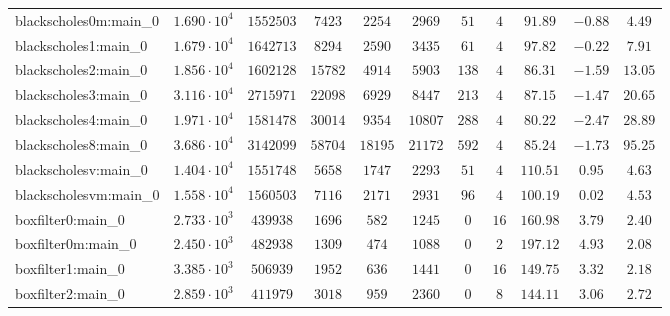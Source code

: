 \begin{tabular}{|l|c|c|c|c|c|c|c|c|c|c|}
blackscholes0m:main\_0         & $ 1.690 \cdot 10^{4} $ & $ 1552503  $ & $ 7423   $ & $ 2254   $ & $ 2969   $ & $ 51   $ & $ 4    $ & $ 91.89       $ & $ -0.88   $ & $ 4.49    $ \\
blackscholes1:main\_0          & $ 1.679 \cdot 10^{4} $ & $ 1642713  $ & $ 8294   $ & $ 2590   $ & $ 3435   $ & $ 61   $ & $ 4    $ & $ 97.82       $ & $ -0.22   $ & $ 7.91    $ \\
blackscholes2:main\_0          & $ 1.856 \cdot 10^{4} $ & $ 1602128  $ & $ 15782  $ & $ 4914   $ & $ 5903   $ & $ 138  $ & $ 4    $ & $ 86.31       $ & $ -1.59   $ & $ 13.05   $ \\
blackscholes3:main\_0          & $ 3.116 \cdot 10^{4} $ & $ 2715971  $ & $ 22098  $ & $ 6929   $ & $ 8447   $ & $ 213  $ & $ 4    $ & $ 87.15       $ & $ -1.47   $ & $ 20.65   $ \\
blackscholes4:main\_0          & $ 1.971 \cdot 10^{4} $ & $ 1581478  $ & $ 30014  $ & $ 9354   $ & $ 10807  $ & $ 288  $ & $ 4    $ & $ 80.22       $ & $ -2.47   $ & $ 28.89   $ \\
blackscholes8:main\_0          & $ 3.686 \cdot 10^{4} $ & $ 3142099  $ & $ 58704  $ & $ 18195  $ & $ 21172  $ & $ 592  $ & $ 4    $ & $ 85.24       $ & $ -1.73   $ & $ 95.25   $ \\
blackscholesv:main\_0          & $ 1.404 \cdot 10^{4} $ & $ 1551748  $ & $ 5658   $ & $ 1747   $ & $ 2293   $ & $ 51   $ & $ 4    $ & $ 110.51      $ & $ 0.95    $ & $ 4.63    $ \\
blackscholesvm:main\_0         & $ 1.558 \cdot 10^{4} $ & $ 1560503  $ & $ 7116   $ & $ 2171   $ & $ 2931   $ & $ 96   $ & $ 4    $ & $ 100.19      $ & $ 0.02    $ & $ 4.53    $ \\
boxfilter0:main\_0             & $ 2.733 \cdot 10^{3} $ & $ 439938   $ & $ 1696   $ & $ 582    $ & $ 1245   $ & $ 0    $ & $ 16   $ & $ 160.98      $ & $ 3.79    $ & $ 2.40    $ \\
boxfilter0m:main\_0            & $ 2.450 \cdot 10^{3} $ & $ 482938   $ & $ 1309   $ & $ 474    $ & $ 1088   $ & $ 0    $ & $ 2    $ & $ 197.12      $ & $ 4.93    $ & $ 2.08    $ \\
boxfilter1:main\_0             & $ 3.385 \cdot 10^{3} $ & $ 506939   $ & $ 1952   $ & $ 636    $ & $ 1441   $ & $ 0    $ & $ 16   $ & $ 149.75      $ & $ 3.32    $ & $ 2.18    $ \\
boxfilter2:main\_0             & $ 2.859 \cdot 10^{3} $ & $ 411979   $ & $ 3018   $ & $ 959    $ & $ 2360   $ & $ 0    $ & $ 8    $ & $ 144.11      $ & $ 3.06    $ & $ 2.72    $ \\

\end{tabular}

